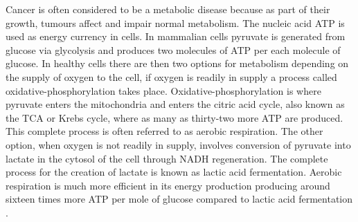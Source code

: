Cancer is often considered to be a metabolic disease because as part of their growth, tumours affect and impair normal metabolism. The nucleic acid \ac{ATP} is used as energy currency in cells. In mammalian cells pyruvate is generated from glucose via glycolysis and produces two molecules of \ac{ATP} per each molecule of glucose. In healthy cells there are then two options for metabolism depending on the supply of oxygen to the cell, if oxygen is readily in supply a process called oxidative-phosphorylation takes place. Oxidative-phosphorylation is where pyruvate enters the mitochondria and enters the citric acid cycle, also known as the \ac{TCA} or Krebs cycle, where as many as thirty-two more \ac{ATP} are produced. This complete process is often referred to as aerobic respiration. The other option, when oxygen is not readily in supply, involves conversion of pyruvate into lactate in the cytosol of the cell through NADH regeneration. The complete process for the creation of lactate is known as lactic acid fermentation. Aerobic respiration is much more efficient in its energy production producing  around sixteen times more \ac{ATP} per mole of glucose compared to lactic acid fermentation \cite{Romero-Garcia2011TumorView}. 

